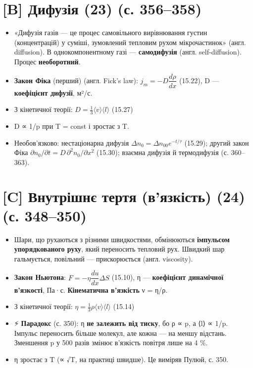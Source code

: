 \documentclass[11pt,a4paper,oneside]{book}
\newcommand{\spark}{{\sffamily\color{warncol}⚡}}
\begin{document}
\section*{[B] Дифузія (23) (с. 356–358)}
\begin{itemize}
\item «Дифузія газів — це процес самовільного вирівнювання густин (концентрацій) у суміші, зумовлений тепловим рухом мікрочастинок» (англ. diffusion). В однокомпонентному газі — \textbf{самодифузія} (англ. self-diffusion). Процес \textbf{необоротний}.
\item \textbf{Закон Фіка} (перший) (англ. Fick's law): $j_m = -D\dfrac{d\rho}{dx}$ (15.22), D — \textbf{коефіцієнт дифузії}, м²/с.
\item З кінетичної теорії: $D = \tfrac13\langle v\rangle\langle l\rangle$ (15.27)
\item D ∝ 1/p при T = const і зростає з T.
\item Необов'язково: нестаціонарна дифузія $\Delta n_0 = \Delta n_{00}e^{-t/\tau}$ (15.29); другий закон Фіка $\partial n_0/\partial t = D\,\partial^2n_0/\partial x^2$ (15.30); взаємна дифузія й термодифузія (с. 360–363).
\end{itemize}

\section*{[C] Внутрішнє тертя (в'язкість) (24) (с. 348–350)}
\begin{itemize}
\item Шари, що рухаються з різними швидкостями, обмінюються \textbf{імпульсом упорядкованого руху}, який переносить тепловий рух. Швидкий шар гальмується, повільний — прискорюється (англ. viscosity).
\item \textbf{Закон Ньютона}: $F = -\eta\dfrac{du}{dx}\Delta S$ (15.10), η — \textbf{коефіцієнт динамічної в'язкості}, Па·с. \textbf{Кінематична в'язкість} ν = η/ρ.
\item З кінетичної теорії: $\eta = \tfrac13\rho\langle v\rangle\langle l\rangle$ (15.14)
\item \spark{} \textbf{Парадокс} (с. 350): η \textbf{не залежить від тиску}, бо ρ ∝ p, а ⟨l⟩ ∝ 1/p. Імпульс переносить більше молекул, але кожна — на меншу відстань. Зменшення p у 500 разів змінює в'язкість повітря лише на 4 \%.
\item η зростає з T (∝ √T, на практиці швидше). Це виміряв Пулюй, с. 350.
\end{itemize}
\end{document}
